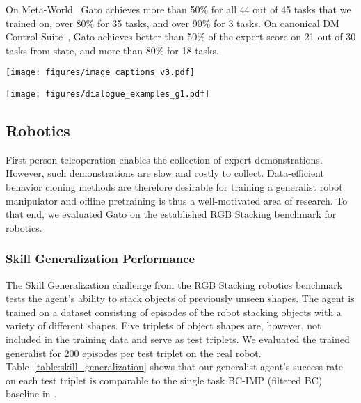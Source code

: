 \documentclass[10pt]{article} \usepackage[accepted]{tmlr}
\newcommand{\model}{{Gato}}
\begin{document}
On Meta-World~\citep{yu2020meta} \model{} achieves more than 50\% for all 44 out of 45 tasks that we trained on, over 80\% for 35 tasks, and over 90\% for 3 tasks.
On canonical DM Control Suite~\citep{tassa2018deepmind}, \model{} achieves better than 50\% of the expert score on 21 out of 30 tasks from state, and more than 80\% for 18 tasks.
\begin{figure*}[hbtp]
    \centering
    \texttt{[image: figures/image\_captions\_v3.pdf]}
    \caption{{\bf Image captions generated by \model{}.} \model{} prompted to be an image captioner, describing the first several held-out images from MS-COCO. We report the first three captions sampled using temperature 0.9, without cherry-picking. The prompt is shown in the appendix.
    \label{fig:vlm_caption_samples}}
\bigskip
\texttt{[image: figures/dialogue\_examples\_g1.pdf]}
    \caption{\textbf{Chitchat with \model{}.} Dialogues with \model{} when it is prompted to be a chat bot. Usually \model{} replies with a relevant response, but is often superficial or factually incorrect, which could likely be improved with further scaling. We used the same prompt as in~\citet{rae2021scaling}.
    \label{fig:chatbot_samples}}
\end{figure*}
\vskip 0.4cm
\subsection{Robotics}
\label{robotics_zeroshot}
\vskip 0.2cm
First person teleoperation enables the collection of expert demonstrations. However, such demonstrations are slow and costly to collect. 
Data-efficient behavior cloning methods are therefore desirable for training a generalist robot manipulator and offline pretraining is thus a well-motivated area of research.
To that end, we evaluated \model{} on the established RGB Stacking benchmark for robotics.
\vskip 0.4cm
\subsubsection*{Skill Generalization Performance}
\vskip 0.2cm
The Skill Generalization challenge from the RGB Stacking robotics benchmark tests the agent's ability to stack objects of previously unseen shapes. The agent is trained on a dataset consisting of episodes of the robot stacking objects with a variety of different shapes. Five triplets of object shapes are, however, not included in the training data and serve as test triplets.
We evaluated the trained generalist for 200 episodes per test triplet on the real robot. Table~\ref{table:skill_generalization} shows that our generalist agent's success rate on each test triplet is comparable to the single task BC-IMP (filtered BC) baseline in \cite{lee2021beyond}.
\end{document}
